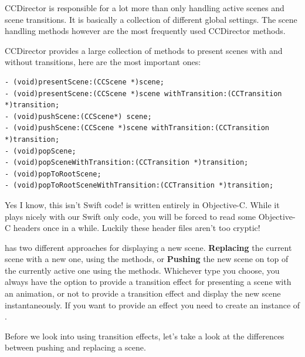 \begin{details} 
CCDirector is responsible for a lot more than only handling active scenes and
scene transitions. It is basically a collection of different global \cocos{}
settings. The scene handling methods however are the most frequently used
CCDirector methods.
\end{details}

CCDirector provides a large collection of methods to present scenes with and
without transitions, here are the most important ones:
\begin{lstlisting}
- (void)presentScene:(CCScene *)scene;
- (void)presentScene:(CCScene *)scene withTransition:(CCTransition *)transition;
- (void)pushScene:(CCScene*) scene;
- (void)pushScene:(CCScene *)scene withTransition:(CCTransition *)transition;
- (void)popScene;
- (void)popSceneWithTransition:(CCTransition *)transition;
- (void)popToRootScene;
- (void)popToRootSceneWithTransition:(CCTransition *)transition;
\end{lstlisting}

\begin{details}
Yes I know, this isn't Swift code! \cocos{} is written entirely in Objective-C.
While it plays nicely with our Swift only code, you will be forced to read some
Objective-C headers once in a while. Luckily these header files aren't too
cryptic!
\end{details}

\cocos{} has two different approaches for displaying a new scene.
\textbf{Replacing} the current scene with a new one, using the
 methods, or \textbf{Pushing} the new scene on top of
the currently active one using the  methods. Whichever
type you choose, you always have the option to provide a transition effect for
presenting a scene with an animation, or not to provide a transition effect and
display the new scene instantaneously. If you want to provide an effect you need to create an
instance of .

Before we look into using transition effects, let's take a look at the
differences between pushing and replacing a scene.

